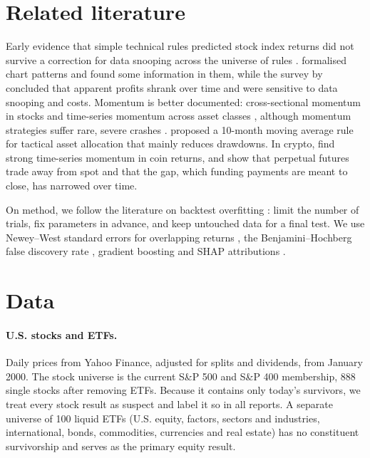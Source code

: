 \documentclass[11pt]{article}
\begin{document}
\section{Related literature}

Early evidence that simple technical rules predicted stock index returns \citep{brock1992simple} did
not survive a correction for data snooping across the universe of rules
\citep{sullivan1999data,white2000reality}. \citet{lo2000foundations} formalised chart patterns and
found some information in them, while the survey by \citet{park2007profitability} concluded that
apparent profits shrank over time and were sensitive to data snooping and costs.
Momentum is better documented: cross-sectional momentum in stocks \citep{jegadeesh1993returns} and
time-series momentum across asset classes \citep{moskowitz2012time}, although momentum strategies
suffer rare, severe crashes \citep{daniel2016momentum}. \citet{faber2007quantitative} proposed a
10-month moving average rule for tactical asset allocation that mainly reduces drawdowns. In crypto,
\citet{liu2021risks} find strong time-series momentum in coin returns, and \citet{he2022perpetual}
show that perpetual futures trade away from spot and that the gap, which funding payments are meant
to close, has narrowed over time.

On method, we follow the literature on backtest overfitting
\citep{bailey2014pseudo,bailey2014deflated,lopezdeprado2018advances}: limit the number of trials,
fix parameters in advance, and keep untouched data for a final test. We use Newey--West standard
errors for overlapping returns \citep{newey1987simple}, the Benjamini--Hochberg false discovery rate
\citep{benjamini1995controlling}, gradient boosting \citep{ke2017lightgbm} and SHAP attributions
\citep{lundberg2017unified}.

\section{Data}

\paragraph{U.S. stocks and ETFs.} Daily prices from Yahoo Finance, adjusted for splits and dividends,
from January 2000. The stock universe is the current S\&P 500 and S\&P 400 membership, 888 single
stocks after removing ETFs. Because it contains only today's survivors, we treat every stock result
as suspect and label it so in all reports. A separate universe of 100 liquid ETFs (U.S. equity,
factors, sectors and industries, international, bonds, commodities, currencies and real estate) has
no constituent survivorship and serves as the primary equity result.
\end{document}
